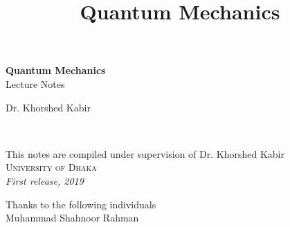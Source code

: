 \documentclass[11pt,fleqn]{book} %
\begin{document}
\title{Quantum Mechanics}


\begingroup
\thispagestyle{empty}
\centering
\vspace*{5cm}
\par\normalfont\fontsize{35}{35}\sffamily\selectfont
\textbf{Quantum Mechanics}\\
{\LARGE Lecture Notes}\par %
\vspace*{1cm}
{\Huge Dr. Khorshed Kabir}\par %
\endgroup


\newpage
~\vfill
\thispagestyle{empty}





{\noindent This notes are compiled under supervision of Dr. Khorshed Kabir}\\ %

{\noindent \textsc{University of Dhaka}}\\

{\noindent \textit{First release, %
	 2019}} %


\newpage


Thanks to the following individuals \\
{\centering
Muhammad Shahnoor Rahman}



\end{document}
